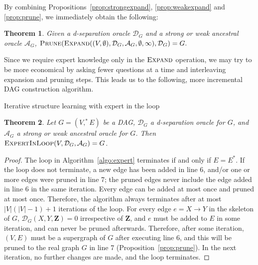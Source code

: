 \documentclass{uai2025} %
\newtheorem{theorem}{Theorem}
\begin{document}
By combining Propositions~\ref{prop:strongexpand}, \ref{prop:weakexpand} and 
\ref{prop:prune}, we immediately obtain the following:

\begin{theorem}
Given a d-separation oracle $\mathcal{D}_G$ and a strong or weak 
ancestral oracle $\mathcal{A}_G$, 
$\textsc{Prune}(\textsc{Expand}((V,\emptyset),\mathcal{D}_G,\mathcal{A}_G,\emptyset,\infty),\mathcal{D}_G)=G.$
\end{theorem}

Since we require expert knowledge only in the $\textsc{Expand}$ operation, we may try
to be more economical by asking fewer questions at a time and interleaving expansion and
pruning steps. This leads us to the following, more incremental DAG construction algorithm.

\begin{algorithm}[h]
\DontPrintSemicolon
\SetAlgoLined
{}


\caption{Iterative structure learning with expert in the loop}
\label{algo:expert}
\end{algorithm} 

\begin{theorem}
Let $G=(V,^*E)$ be a DAG, $\mathcal{D}_G$ a d-separation oracle for $G$, and 
$\mathcal{A}_G$ a strong or weak ancestral oracle for $G$. Then 
$\textsc{ExpertInLoop}(V,\mathcal{D}_G,\mathcal{A}_G)=G$.
\end{theorem}

\begin{proof}
The loop in Algorithm~\ref{algo:expert} terminates if and only if $E=E^*$. If the loop does not 
terminate, a new edge has been added in line 6, and/or one or more edges were pruned in line 7; the pruned 
edges never include the edge added in line 6 in the same iteration.
Every edge can be added at 
most once and pruned at most once. Therefore, the algorithm always terminates
after at most $|V|(|V|-1)+1$ iterations of the loop. For every edge $e=X\to Y $ in the skeleton of $G$, $\mathcal{D}_G(X,Y,\mathbf{Z})=0$ irrespective of $\mathbf{Z}$, and $e$ must be added to $E$ in some iteration, and can never be pruned afterwards. Therefore, after some iteration, $(V,E)$ must be a supergraph of $G$ after executing line 6, and this will be pruned to the real graph $G$ in line 7 (Proposition~\ref{prop:prune}). In the next iteration, no further changes are made, and the loop terminates.
\end{proof} 
\end{document}
